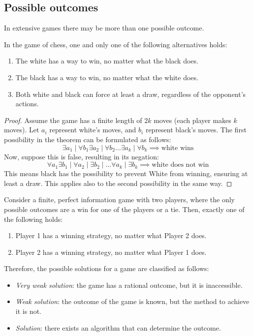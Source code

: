 \subsection{Possible outcomes}
In extensive games there may be more than one possible outcome. 
\begin{theorem}
    In the game of chess, one and only one of the following alternatives holds:
    \begin{enumerate}
        \item The white has a way to win, no matter what the black does.
        \item The black has a way to win, no matter what the white does.
        \item Both white and black can force at least a draw, regardless of the opponent's actions.
    \end{enumerate}
\end{theorem}
\begin{proof}
    Assume the game has a finite length of $2k$ moves (each player makes $k$ moves). 
    Let $a_i$ represent white's moves, and $b_i$ represent black's moves. 
    The first possibility in the theorem can be formulated as follows:
    \[\exists a_1 \mid \forall b_1 \exists a_2 \mid \forall b_2 \dots \exists a_k \mid \forall b_k \implies \text{white wins}\]
    Now, suppose this is false, resulting in its negation:
    \[\forall a_1 \exists b_1 \mid \forall a_2 \mid \exists b_2 \mid \dots \forall a_k \mid \exists b_k \implies \text{white does not win}\]
    This means black has the possibility to prevent White from winning, ensuring at least a draw.
    This applies also to the second possibility in the same way. 
\end{proof}
\begin{corollary}
    Consider a finite, perfect information game with two players, where the only possible outcomes are a win for one of the players or a tie. 
    Then, exactly one of the following holds:
    \begin{enumerate}
        \item Player 1 has a winning strategy, no matter what Player 2 does.
        \item Player 2 has a winning strategy, no matter what Player 1 does.
    \end{enumerate}
\end{corollary}
\noindent Therefore, the possible solutions for a game are classified as follows:
\begin{itemize}
    \item \textit{Very weak solution}: the game has a rational outcome, but it is inaccessible.
    \item \textit{Weak solution}: the outcome of the game is known, but the method to achieve it is not.
    \item \textit{Solution}: there exists an algorithm that can determine the outcome.
\end{itemize}